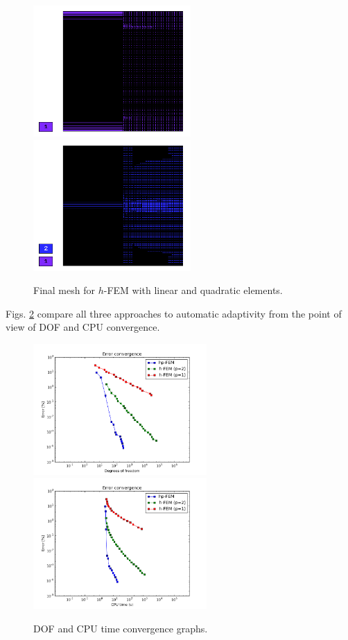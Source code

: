 \documentclass[12pt]{elsarticle}
\begin{document}
\begin{figure}[!ht]
\centering
\includegraphics[height=5cm]{nist/nist-10/mesh_h1_aniso.png}\ \
\includegraphics[height=5cm]{nist/nist-10/mesh_h2_aniso.png}
\caption{Final mesh for $h$-FEM with linear and quadratic elements.}
\label{fig:nist-10-h-aniso}
\end{figure}

Figs. \ref{fig:nist-10-conv} compare all
three approaches to automatic adaptivity from the point
of view of DOF and CPU convergence.

\begin{figure}[!ht]
\centering
\includegraphics[height=5cm]{nist/nist-10/conv_dof_aniso.png}\ \
\includegraphics[height=5cm]{nist/nist-10/conv_cpu_aniso.png}
\caption{DOF and CPU time convergence graphs.}
\label{fig:nist-10-conv}
\end{figure}
\end{document}
